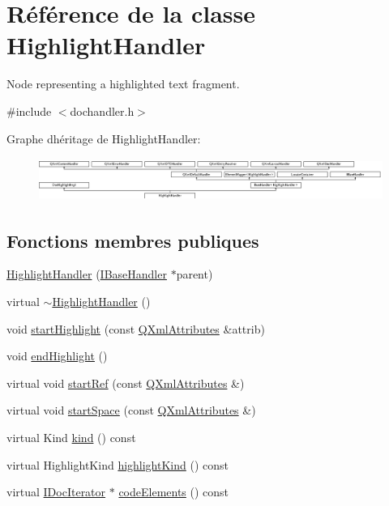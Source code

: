 \hypertarget{class_highlight_handler}{}\section{Référence de la classe Highlight\+Handler}
\label{class_highlight_handler}


Node representing a highlighted text fragment.  




{\ttfamily \#include $<$dochandler.\+h$>$}

Graphe d\textquotesingle{}héritage de Highlight\+Handler\+:\begin{figure}[H]
\begin{center}
\leavevmode
\includegraphics[height=1.415929cm]{class_highlight_handler}
\end{center}
\end{figure}
\subsection*{Fonctions membres publiques}
\begin{DoxyCompactItemize}
\item 
\hyperlink{class_highlight_handler_ae00bea7c9612d3f242cb30b60b5c35c1}{Highlight\+Handler} (\hyperlink{class_i_base_handler}{I\+Base\+Handler} $\ast$parent)
\item 
virtual \hyperlink{class_highlight_handler_aa4b4cfb0233d2f46ed5d39ec6066831d}{$\sim$\+Highlight\+Handler} ()
\item 
void \hyperlink{class_highlight_handler_a66b287f9ec5fc6d251595e97cff0d6cf}{start\+Highlight} (const \hyperlink{class_q_xml_attributes}{Q\+Xml\+Attributes} \&attrib)
\item 
void \hyperlink{class_highlight_handler_aaac89f347545f88c79857234065ec9d9}{end\+Highlight} ()
\item 
virtual void \hyperlink{class_highlight_handler_a5c42568fc0ad6b0666cb7c3e24182c5c}{start\+Ref} (const \hyperlink{class_q_xml_attributes}{Q\+Xml\+Attributes} \&)
\item 
virtual void \hyperlink{class_highlight_handler_a4d4afb71d7af981477f582c3692cae56}{start\+Space} (const \hyperlink{class_q_xml_attributes}{Q\+Xml\+Attributes} \&)
\item 
virtual Kind \hyperlink{class_highlight_handler_ad3860d3606630f425a598b90f43729f3}{kind} () const 
\item 
virtual Highlight\+Kind \hyperlink{class_highlight_handler_a33c283def6d9921d842038691bb92494}{highlight\+Kind} () const 
\item 
virtual \hyperlink{class_i_doc_iterator}{I\+Doc\+Iterator} $\ast$ \hyperlink{class_highlight_handler_a49c8211da49b4f126fa7eefad4b260ea}{code\+Elements} () const 
\end{DoxyCompactItemize}
